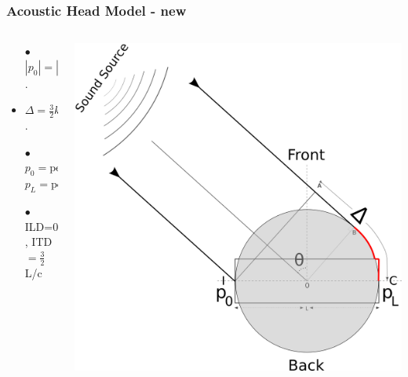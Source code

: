 \documentclass{beamer}
\begin{document}
\begin{frame}[t]
 \frametitle{Acoustic Head Model - new}
 \begin{columns}
     \begin{column}{.5\textwidth}
    \small
    \flushleft
     \begin{itemize}
      \item[$\bullet$] $|p_0|=|p_L|$.
      \item[]
      \item $\Delta=\frac{3}{2}kL\sin\theta$.
      \item[]
      \item[$\bullet$] $p_0=\mbox{p}\mathrm{ exp}\left(-j\Delta/2\right)$\\ $p_L=\mbox{p}\mathrm{ exp}\left(j\Delta/2\right)$
      \item[$\bullet$] ILD=0, ITD$=\frac{3}{2}$L/c
      \end{itemize}
    \end{column}
    
 \begin{column}{0.5\textwidth}
    \includegraphics[width = 6 cm]{Diagrams/Presentation/acousticheadmodel2.png}\\
    \end{column}

    \end{columns}
\end{frame}
\end{document}
